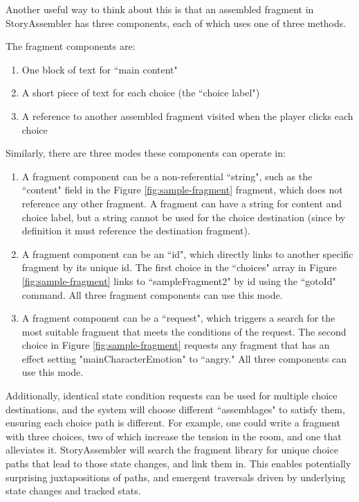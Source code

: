 Another useful way to think about this is that an assembled fragment in StoryAssembler has three components, each of which uses one of three methods. 

The fragment components are:

\begin{enumerate}
    \item One block of text for ``main content"
    \item A short piece of text for each choice (the ``choice label")
    \item A reference to another assembled fragment visited when the player clicks each choice
\end{enumerate}

Similarly, there are three modes these components can operate in:

\begin{enumerate}
    \item A fragment component can be a non-referential ``string", such as the ``content" field in the Figure \ref{fig:sample-fragment} fragment, which does not reference any other fragment. A fragment can have a string for content and choice label, but a string cannot be used for the choice destination (since by definition it must reference the destination fragment).
    \item A fragment component can be an ``id", which directly links to another specific fragment by its unique id. The first choice in the ``choices" array in Figure \ref{fig:sample-fragment} links to ``sampleFragment2" by id using the ``gotoId" command. All three fragment components can use this mode.
    \item A fragment component can be a ``request", which triggers a search for the most suitable fragment that meets the conditions of the request. The second choice in Figure \ref{fig:sample-fragment} requests any fragment that has an effect setting "mainCharacterEmotion" to ``angry." All three components can use this mode.
\end{enumerate}

Additionally, identical state condition requests can be used for multiple choice destinations, and the system will choose different ``assemblages" to satisfy them, ensuring each choice path is different. For example, one could write a fragment with three choices, two of which increase the tension in the room, and one that alleviates it. StoryAssembler will search the fragment library for unique choice paths that lead to those state changes, and link them in. This enables potentially surprising juxtapositions of paths, and emergent traversals driven by underlying state changes and tracked stats.


